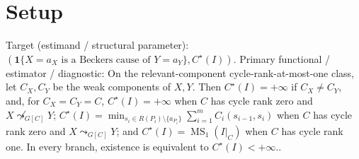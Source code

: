 \documentclass{article}
\begin{document}
\section{Setup}

Target (estimand / structural parameter): \((\mathbf 1\{X=a_X\text{ is a Beckers cause of }Y=a_Y\},C^\star(I))\).
Primary functional / estimator / diagnostic: On the relevant-component cycle-rank-at-most-one class, let \(C_X,C_Y\) be the weak components of \(X,Y\).  Then \(C^\star(I)=+\infty\) if \(C_X\ne C_Y\), and, for \(C_X=C_Y=C\), \(C^\star(I)=+\infty\) when \(C\) has cycle rank zero and \(X\not\leadsto_{G[C]}Y\); \(C^\star(I)=\min_{s_i\in R(P_i)\setminus\{a_{P_i}\}}\sum_{i=1}^m C_i(s_{i-1},s_i)\) when \(C\) has cycle rank zero and \(X\leadsto_{G[C]}Y\); and \(C^\star(I)=\operatorname{MS}_1(I|_C)\) when \(C\) has cycle rank one.  In every branch, existence is equivalent to \(C^\star(I)<+\infty\)..
\end{document}
